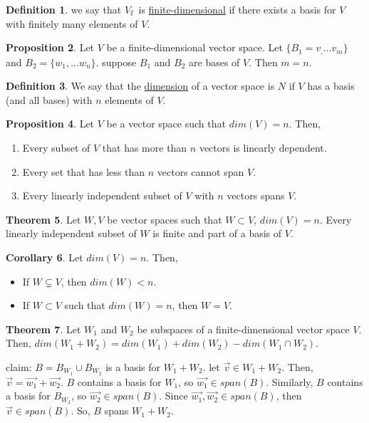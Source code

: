 \documentclass[a5paper]{article}
\makeatletter
\renewenvironment{proof}{{\bfseries Proof}}{\qed}
\renewenvironment{proof}[1][\bfseries \proofname]{\par
  \pushQED{\qed}%
  \normalfont \topsep6\p@\@plus6\p@\relax
  \trivlist
  \item[\hskip\labelsep
        \scshape
    #1\@addpunct{}]\ignorespaces
}{%
  \popQED\endtrivlist\@endpefalse
}
\theoremstyle{definition}%
\newtheorem{theorem}{Theorem}
\numberwithin{theorem}{section} %
\newtheorem{corollary}[theorem]{Corollary}
\newtheorem{definition}[theorem]{Definition}
\newtheorem{proposition}[theorem]{Proposition}
\newcommand{\F}{\mathbb{F}}
\makeatother
\begin{document}
\begin{definition}
we say that $V_\F$ is \underline{finite-dimensional} if there exists a basis for $V$ with finitely many elements of $V$. 
\end{definition}

\begin{proposition}
Let $V$ be a finite-dimensional vector space. Let $\{B_1 = v_, ... v_m\}$ and $B_2 = \{w_1, ... w_n\}$. suppose $B_1$ and $B_2$  are bases of $V$. 
Then $m = n$.
\end{proposition}

\begin{definition}
We say that the \underline{dimension} of a vector space is $N$ if $V$ has a basis (and all bases) with $n$ elements of $V$. 
\end{definition}

\begin{proposition}
Let $V$ be a vector space such that $dim(V)=n$. Then, 
\begin{enumerate}
\item Every subset of $V$ that has more than $n$ vectors is linearly dependent.
\item Every set that has less than $n$ vectors cannot span $V$.
\item Every linearly independent subset of $V$ with $n$ vectors spans $V$. 
\end{enumerate}
\end{proposition}

\begin{theorem}
Let $W, V$ be vector spaces such that $W \subset V$, $dim(V) = n$. Every linearly independent subset of $W$ is finite and part of a basis of $V$. 
\end{theorem}

\begin{corollary}
Let $dim(V) = n$. Then, 
\begin{itemize}
\item If $W \subsetneq V$, then $dim(W) < n$.
\item If $W \subset V$ such that $dim(W) = n$, then $W = V$.
\end{itemize}
\end{corollary}

\begin{theorem}
Let $W_1$ and $W_2$ be subspaces of a finite-dimensional vector space $V$. Then, $dim(W_1 + W_2) = dim(W_1) + dim(W_2) - dim(W_1 \cap W_2)$.
\begin{proof}
claim: $B = B_{W_1} \cup B_{W_2}$ is a basis for $W_1 + W_2$.
let $\vec{v} \in W_1 + W_2$. Then, $\vec{v} = \vec{w_1} + \vec{w_2}$. $B$ contains a basis for $W_1$, so $\vec{w_1} \in span(B)$. Similarly, $B$ contains a basis for $B_{W_2}$, so $\vec{w_2} \in span(B)$. Since $\vec{w_1}, \vec{w_2} \in span(B)$, then $\vec{v} \in span(B)$. So, $B$ spans $W_1 + W_2$. 
\end{proof}
\end{theorem}
\end{document}
